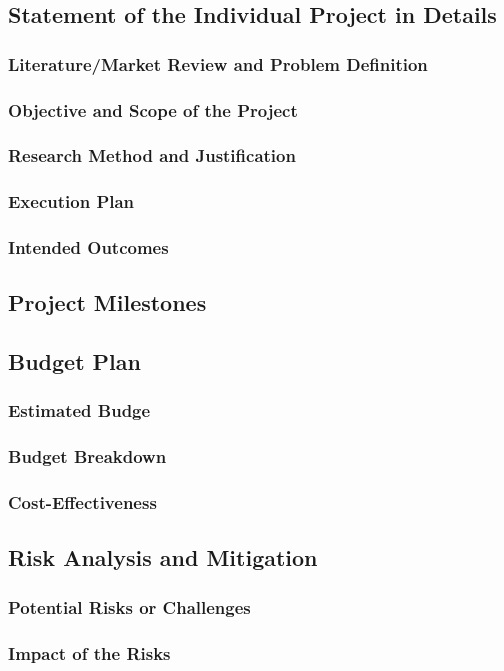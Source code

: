 \documentclass[12pt]{article}
\begin{document}
\subsection{Statement of the Individual Project in Details}
\subsubsection{Literature/Market Review and Problem Definition}
\subsubsection{Objective and Scope of the Project}
\subsubsection{Research Method and Justification}
\subsubsection{Execution Plan}
\subsubsection{Intended Outcomes}


\subsection{Project Milestones}
\subsection{Budget Plan}
\subsubsection{Estimated Budge}
\subsubsection{Budget Breakdown}
\subsubsection{Cost-Effectiveness}

\subsection{Risk Analysis and Mitigation}
\subsubsection{Potential Risks or Challenges}
\subsubsection{Impact of the Risks}

\newpage


\end{document}
